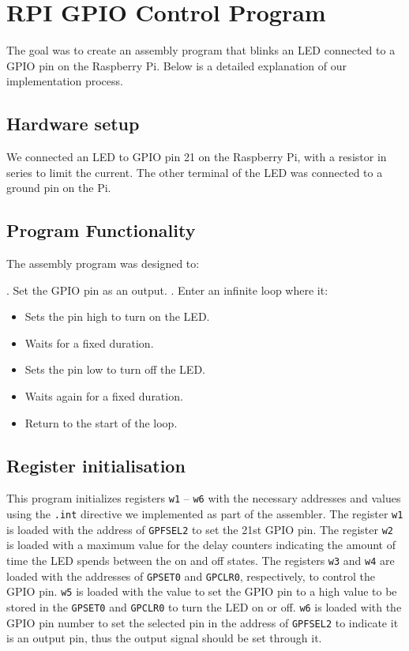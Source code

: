 \documentclass[9pt,a4paper,twoside]{tau-class/tau}
\begin{document}
    \section{RPI GPIO Control Program}
    The goal was to create an assembly program that blinks an LED connected to a GPIO pin on the Raspberry Pi. Below is a detailed explanation of our implementation process. 

    \subsection{Hardware setup}
    We connected an LED to GPIO pin 21 on the Raspberry Pi, with a resistor in series to limit the current. The other terminal of the LED was connected to a ground pin on the Pi.  
    
    \subsection{Program Functionality}      
    The assembly program was designed to: 
    
    . Set the GPIO pin as an output. 
    . Enter an infinite loop where it: 
    \begin{itemize}
        \item Sets the pin high to turn on the LED.
        \item Waits for a fixed duration.
        \item Sets the pin low to turn off the LED.
        \item Waits again for a fixed duration.
        \item Return to the start of the loop.
    \end{itemize}
    
    \subsection{Register initialisation}   
    This program initializes registers \texttt{w1} – \texttt{w6} with the necessary addresses and values using the \texttt{.int} directive we implemented as part of the assembler. The register \texttt{w1} is loaded with the address of \texttt{GPFSEL2} to set the 21st GPIO pin. The register \texttt{w2} is loaded with a maximum value for the delay counters indicating the amount of time the LED spends between the on and off states. The registers \texttt{w3} and \texttt{w4} are loaded with the addresses of \texttt{GPSET0} and \texttt{GPCLR0}, respectively, to control the GPIO pin. \texttt{w5} is loaded with the value to set the GPIO pin to a high value to be stored in the \texttt{GPSET0} and \texttt{GPCLR0} to turn the LED on or off. \texttt{w6} is loaded with the GPIO pin number to set the selected pin in the address of \texttt{GPFSEL2} to indicate it is an output pin, thus the output signal should be set through it.  
    
\end{document}
